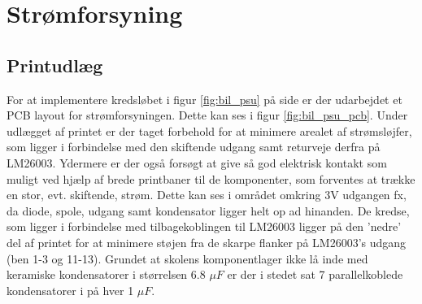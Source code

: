 \section{Strømforsyning}
\subsection{Printudlæg}

For at implementere kredsløbet i figur \ref{fig:bil_psu} på side \pageref{fig:bil_psu} er der udarbejdet et PCB layout for strømforsyningen.
Dette kan ses i figur \ref{fig:bil_psu_pcb}. 
Under udlægget af printet er der taget forbehold for at minimere arealet af strømsløjfer, som ligger i forbindelse med den skiftende udgang samt returveje derfra på LM26003. Ydermere er der også forsøgt at give så god elektrisk kontakt som muligt ved hjælp af brede printbaner til de komponenter, som forventes at trække en stor, evt. skiftende, strøm.
Dette kan ses i området omkring 3V udgangen fx, da diode, spole, udgang samt kondensator ligger helt op ad hinanden. 
De kredse, som ligger i forbindelse med tilbagekoblingen til LM26003 ligger på den 'nedre' del af printet for at minimere støjen fra de skarpe flanker på LM26003's udgang (ben 1-3 og 11-13).
Grundet at skolens komponentlager ikke lå inde med keramiske kondensatorer i størrelsen 6.8 $\mu F$ er der i stedet sat 7 parallelkoblede kondensatorer i på hver 1 $\mu F$.

\vfill

